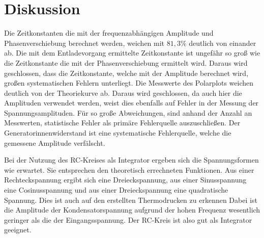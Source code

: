 \section{Diskussion}
\label{sec:Diskussion}

Die Zeitkonstanten die mit der frequenzabhängigen Amplitude und Phasenverschiebung berechnet werden, weichen mit $81,3\%$
deutlich von einander ab.
Die mit dem Entladevorgang ermittelte Zeitkonstante ist ungefähr so groß wie die Zeitkonstante die mit der
Phasenverschiebung ermittelt wird. Daraus wird geschlossen, dass die Zeitkonstante, welche mit der Amplitude
berechnet wird, großen systematischen Fehlern unterliegt.
Die Messwerte des Polarplots weichen deutlich von der Theoriekurve ab. Daraus wird geschlossen, da auch hier die
Amplituden verwendet werden, weist dies ebenfalls auf Fehler in der Messung der Spannungsamplituden. Für so
große Abweichungen, sind anhand der Anzahl an Messwerten, statistische Fehler als primäre Fehlerquelle auszuschließen.
Der Generatorinnenwiderstand ist eine systematische Fehlerquelle, welche die gemessene Amplitude verfälscht.

Bei der Nutzung des RC-Kreises als Integrator ergeben sich die Spannungsformen
wie erwartet. Sie entsprechen den theoretisch errechneten Funktionen.
Aus einer Rechteckspannung ergibt sich eine Dreieckspannung, aus einer
Sinusspannung eine Cosinusspannung und aus einer Dreieckspannung eine
quadratische Spannung. Dies ist auch auf den erstellten Thermodrucken zu erkennen
Dabei ist die Amplitude der Kondensatorspannung aufgrund der hohen Frequenz wesentlich
geringer als die der Eingangsspannung. Der RC-Kreis ist also gut als Integrator
geeignet.
